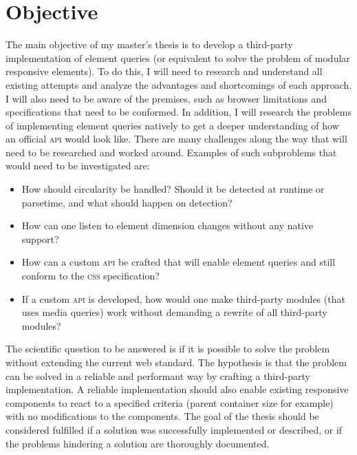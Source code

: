 \documentclass[oneside,a4paper,11pt]{kth-mag}
\begin{document}
\section*{Objective}
The main objective of my master's thesis is to develop a third-party implementation of element queries (or equivalent to solve the problem of modular responsive elements). To do this, I will need to research and understand all existing attempts and analyze the advantages and shortcomings of each approach. I will also need to be aware of the premises, such as browser limitations and specifications that need to be conformed. In addition, I will research the problems of implementing element queries natively to get a deeper understanding of how an official \textsc{api} would look like. There are many challenges along the way that will need to be researched and worked around. Examples of such subproblems that would need to be investigated are:
\begin{itemize}
\item How should circularity be handled? Should it be detected at runtime or parsetime, and what should happen on detection?
\item How can one listen to element dimension changes without any native support?
\item How can a custom \textsc{api} be crafted that will enable element queries and still conform to the \textsc{css} specification?
\item If a custom \textsc{api} is developed, how would one make third-party modules (that uses media queries) work without demanding a rewrite of all third-party modules?
\end{itemize}
The scientific question to be answered is if it is possible to solve the problem  without extending the current web standard. The hypothesis is that the problem can be solved in a reliable and performant way by crafting a third-party implementation. A reliable implementation should also enable existing responsive components to react to a specified criteria (parent container size for example) with no modifications to the components. The goal of the thesis should be considered fulfilled if a solution was successfully implemented or described, or if the problems hindering a solution are thoroughly documented.
\end{document}
